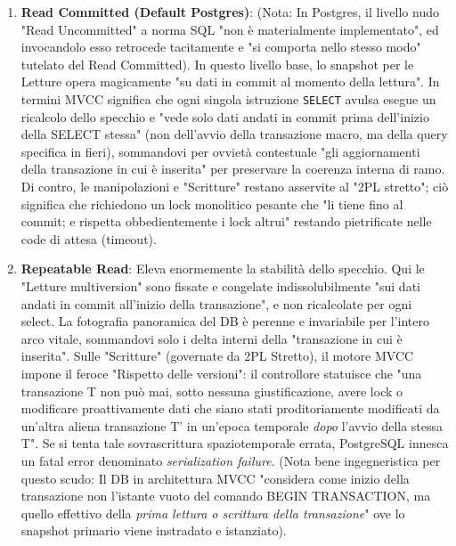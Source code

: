 \begin{enumerate}
    \item \textbf{Read Committed (Default Postgres)}:
    (Nota: In Postgres, il livello nudo "Read Uncommitted" a norma SQL "non è materialmente implementato", ed invocandolo esso retrocede tacitamente e "si comporta nello stesso modo" tutelato del Read Committed).
    In questo livello base, lo snapshot per le Letture opera magicamente "su dati in commit al momento della lettura". In termini MVCC significa che ogni singola istruzione \texttt{SELECT} avulsa esegue un ricalcolo dello specchio e "vede solo dati andati in commit prima dell'inizio della SELECT stessa" (non dell'avvio della transazione macro, ma della query specifica in fieri), sommandovi per ovvietà contestuale "gli aggiornamenti della transazione in cui è inserita" per preservare la coerenza interna di ramo.
    Di contro, le manipolazioni e "Scritture" restano asservite al "2PL stretto"; ciò significa che richiedono un lock monolitico pesante che "li tiene fino al commit; e rispetta obbedientemente i lock altrui" restando pietrificate nelle code di attesa (timeout).

    \item \textbf{Repeatable Read}:
    Eleva enormemente la stabilità dello specchio. Qui le "Letture multiversion" sono fissate e congelate indissolubilmente "sui dati andati in commit all'inizio della transazione", e non ricalcolate per ogni select. La fotografia panoramica del DB è perenne e invariabile per l'intero arco vitale, sommandovi solo i delta interni della "transazione in cui è inserita".
    Sulle "Scritture" (governate da 2PL Stretto), il motore MVCC impone il feroce "Rispetto delle versioni": il controllore statuisce che "una transazione T non può mai, sotto nessuna giustificazione, avere lock o modificare proattivamente dati che siano stati proditoriamente modificati da un'altra aliena transazione T' in un'epoca temporale \textit{dopo} l'avvio della stessa T". Se si tenta tale sovrascrittura spaziotemporale errata, PostgreSQL innesca un fatal error denominato \textit{serialization failure}.
    (Nota bene ingegneristica per questo scudo: Il DB in architettura MVCC "considera come inizio della transazione non l'istante vuoto del comando BEGIN TRANSACTION, ma quello effettivo della \textit{prima lettura o scrittura della transazione}" ove lo snapshot primario viene instradato e istanziato).


\end{enumerate}
